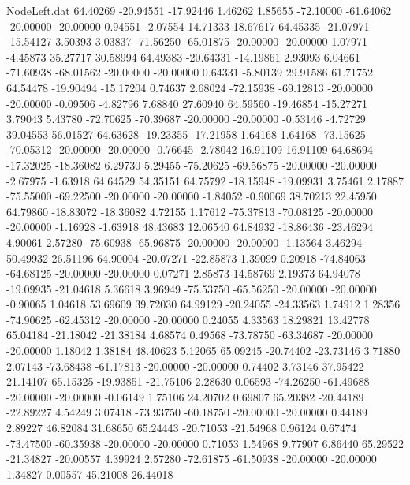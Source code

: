 \begin{filecontents}{NodeLeft.dat}
  64.40269  -20.94551  -17.92446     1.46262    1.85655  -72.10000  -61.64062  -20.00000  -20.00000    0.94551   -2.07554   14.71333   18.67617
  64.45335  -21.07971  -15.54127     3.50393    3.03837  -71.56250  -65.01875  -20.00000  -20.00000    1.07971   -4.45873   35.27717   30.58994
  64.49383  -20.64331  -14.19861     2.93093    6.04661  -71.60938  -68.01562  -20.00000  -20.00000    0.64331   -5.80139   29.91586   61.71752
  64.54478  -19.90494  -15.17204     0.74637    2.68024  -72.15938  -69.12813  -20.00000  -20.00000   -0.09506   -4.82796    7.68840   27.60940
  64.59560  -19.46854  -15.27271     3.79043    5.43780  -72.70625  -70.39687  -20.00000  -20.00000   -0.53146   -4.72729   39.04553   56.01527
  64.63628  -19.23355  -17.21958     1.64168    1.64168  -73.15625  -70.05312  -20.00000  -20.00000   -0.76645   -2.78042   16.91109   16.91109
  64.68694  -17.32025  -18.36082     6.29730    5.29455  -75.20625  -69.56875  -20.00000  -20.00000   -2.67975   -1.63918   64.64529   54.35151
  64.75792  -18.15948  -19.09931     3.75461    2.17887  -75.55000  -69.22500  -20.00000  -20.00000   -1.84052   -0.90069   38.70213   22.45950
  64.79860  -18.83072  -18.36082     4.72155    1.17612  -75.37813  -70.08125  -20.00000  -20.00000   -1.16928   -1.63918   48.43683   12.06540
  64.84932  -18.86436  -23.46294     4.90061    2.57280  -75.60938  -65.96875  -20.00000  -20.00000   -1.13564    3.46294   50.49932   26.51196
  64.90004  -20.07271  -22.85873     1.39099    0.20918  -74.84063  -64.68125  -20.00000  -20.00000    0.07271    2.85873   14.58769    2.19373
  64.94078  -19.09935  -21.04618     5.36618    3.96949  -75.53750  -65.56250  -20.00000  -20.00000   -0.90065    1.04618   53.69609   39.72030
  64.99129  -20.24055  -24.33563     1.74912    1.28356  -74.90625  -62.45312  -20.00000  -20.00000    0.24055    4.33563   18.29821   13.42778
  65.04184  -21.18042  -21.38184     4.68574    0.49568  -73.78750  -63.34687  -20.00000  -20.00000    1.18042    1.38184   48.40623    5.12065
  65.09245  -20.74402  -23.73146     3.71880    2.07143  -73.68438  -61.17813  -20.00000  -20.00000    0.74402    3.73146   37.95422   21.14107
  65.15325  -19.93851  -21.75106     2.28630    0.06593  -74.26250  -61.49688  -20.00000  -20.00000   -0.06149    1.75106   24.20702    0.69807
  65.20382  -20.44189  -22.89227     4.54249    3.07418  -73.93750  -60.18750  -20.00000  -20.00000    0.44189    2.89227   46.82084   31.68650
  65.24443  -20.71053  -21.54968     0.96124    0.67474  -73.47500  -60.35938  -20.00000  -20.00000    0.71053    1.54968    9.77907    6.86440
  65.29522  -21.34827  -20.00557     4.39924    2.57280  -72.61875  -61.50938  -20.00000  -20.00000    1.34827    0.00557   45.21008   26.44018

\end{filecontents}
